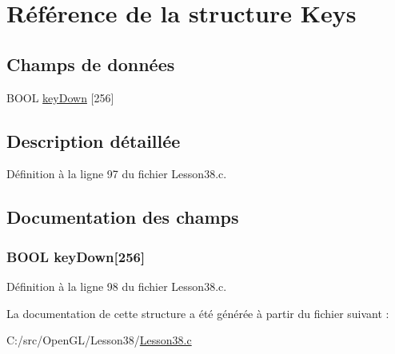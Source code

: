 \hypertarget{struct_keys}{}\section{Référence de la structure Keys}
\label{struct_keys}
\subsection*{Champs de données}
\begin{DoxyCompactItemize}
\item 
B\+O\+OL \hyperlink{struct_keys_a66cdb73ad4c9f59931f7866fd1360051}{key\+Down} \mbox{[}256\mbox{]}
\end{DoxyCompactItemize}


\subsection{Description détaillée}


Définition à la ligne 97 du fichier Lesson38.\+c.



\subsection{Documentation des champs}
\subsubsection[{\texorpdfstring{key\+Down}{keyDown}}]{\setlength{\rightskip}{0pt plus 5cm}B\+O\+OL key\+Down\mbox{[}256\mbox{]}}\hypertarget{struct_keys_a66cdb73ad4c9f59931f7866fd1360051}{}\label{struct_keys_a66cdb73ad4c9f59931f7866fd1360051}


Définition à la ligne 98 du fichier Lesson38.\+c.



La documentation de cette structure a été générée à partir du fichier suivant \+:\begin{DoxyCompactItemize}
\item 
C\+:/src/\+Open\+G\+L/\+Lesson38/\hyperlink{_lesson38_8c}{Lesson38.\+c}\end{DoxyCompactItemize}
